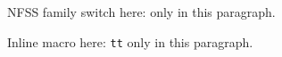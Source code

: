 NFSS family switch here: \ttfamily only in this paragraph.

Inline macro here: \texttt{tt} only in this paragraph.

